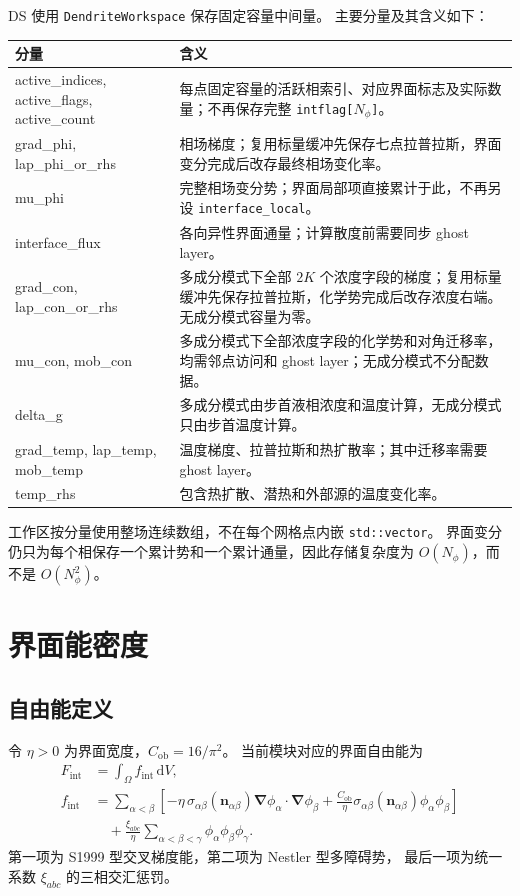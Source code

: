 \documentclass[UTF8,a4paper,11pt]{ctexart}
\newcommand{\dd}{\mathrm{d}}
\newcommand{\grad}{\bm{\nabla}}
\newcommand{\vct}[1]{\bm{#1}}
\begin{document}
DS 使用 \texttt{DendriteWorkspace} 保存固定容量中间量。
主要分量及其含义如下：

\begin{longtable}{>{\ttfamily}p{}p{}}
\toprule
\normalfont 分量 & 含义\\
\midrule
\endhead
active\_indices, active\_flags, active\_count
  & 每点固定容量的活跃相索引、对应界面标志及实际数量；不再保存完整 \texttt{intflag[$N_\phi$]}。\\
grad\_phi, lap\_phi\_or\_rhs
  & 相场梯度；复用标量缓冲先保存七点拉普拉斯，界面变分完成后改存最终相场变化率。\\
mu\_phi
  & 完整相场变分势；界面局部项直接累计于此，不再另设 \texttt{interface\_local}。\\
interface\_flux
  & 各向异性界面通量；计算散度前需要同步 ghost layer。\\
grad\_con, lap\_con\_or\_rhs
  & 多成分模式下全部 \(2K\) 个浓度字段的梯度；复用标量缓冲先保存拉普拉斯，化学势完成后改存浓度右端。无成分模式容量为零。\\
mu\_con, mob\_con
  & 多成分模式下全部浓度字段的化学势和对角迁移率，均需邻点访问和 ghost layer；无成分模式不分配数据。\\
delta\_g
  & 多成分模式由步首液相浓度和温度计算，无成分模式只由步首温度计算。\\
grad\_temp, lap\_temp, mob\_temp
  & 温度梯度、拉普拉斯和热扩散率；其中迁移率需要 ghost layer。\\
temp\_rhs
  & 包含热扩散、潜热和外部源的温度变化率。\\
\bottomrule
\end{longtable}

工作区按分量使用整场连续数组，不在每个网格点内嵌 \texttt{std::vector}。
界面变分仍只为每个相保存一个累计势和一个累计通量，因此存储复杂度为
\(O(N_\phi)\)，而不是 \(O(N_\phi^2)\)。

\section{界面能密度}

\subsection{自由能定义}

令 \(\eta>0\) 为界面宽度，\(C_{\mathrm{ob}}=16/\pi^2\)。
当前模块对应的界面自由能为
\begin{align}
 F_{\mathrm{int}}
 &=\int_\Omega f_{\mathrm{int}}\,\dd V,\\
 f_{\mathrm{int}}
 &=\sum_{\alpha<\beta}
 \left[
 -\eta\,\sigma_{\alpha\beta}(\vct n_{\alpha\beta})
       \grad\phi_\alpha\!\cdot\!\grad\phi_\beta
 +\frac{C_{\mathrm{ob}}}{\eta}
       \sigma_{\alpha\beta}(\vct n_{\alpha\beta})
       \phi_\alpha\phi_\beta
 \right]\nonumber\\
 &\quad
 +\frac{\xi_{abc}}{\eta}
 \sum_{\alpha<\beta<\gamma}
 \phi_\alpha\phi_\beta\phi_\gamma .
\label{eq:fint}
\end{align}
第一项为 S1999 型交叉梯度能，第二项为 Nestler 型多障碍势，
最后一项为统一系数 \(\xi_{abc}\) 的三相交汇惩罚。
\end{document}
